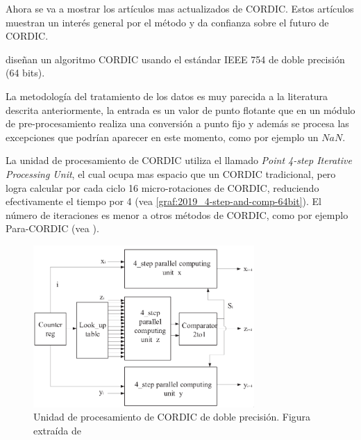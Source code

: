 
Ahora se va a mostrar los artículos mas actualizados de CORDIC. Estos artículos muestran un interés general por el método y da confianza sobre el futuro de CORDIC.

\cite{hou_low_2019} diseñan un algoritmo CORDIC usando el estándar IEEE 754 de doble precisión (64 bits).

La metodología del tratamiento de los datos es muy parecida a la literatura descrita anteriormente, la entrada es un valor de punto flotante que en un módulo de pre-procesamiento realiza una conversión a punto fijo y además se procesa las excepciones que podrían aparecer en este momento, como por ejemplo un $NaN$.

La unidad de procesamiento de CORDIC utiliza el llamado \textit{Point 4-step Iterative Processing Unit}, el cual ocupa mas espacio que un CORDIC tradicional, pero logra calcular por cada ciclo 16 micro-rotaciones de CORDIC, reduciendo efectivamente el tiempo por 4 (vea \ref{graf:2019_4-step-and-comp-64bit}). El número de iteraciones es menor a otros métodos de CORDIC, como por ejemplo Para-CORDIC (vea \cite{tso-bing_juang_para-cordic_2004}).

\begin{figure}[ht]
	\centering
	\includegraphics[width=0.75\textwidth]{archivos/CORDIC/2019_4-step-64bit.png}
	\caption{Unidad de procesamiento de CORDIC de doble precisión. Figura extraída de \cite{yeshwanth_high-speed_2018}}
	\label{graf:2019_4-step-64bit}
\end{figure}

\begin{table}[]
	\centering
	\caption{Número de iteraciones comparando el multiplicador CORDIC con punto flotante de \cite{yeshwanth_high-speed_2018} a otras soluciones.}
	\label{table:2019_4-step-comp-64bit}
\end{table}

